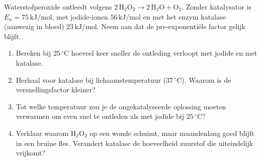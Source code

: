 \begin{oefening}
Waterstofperoxide ontleedt volgens \(\mathrm{2\,H_2O_2 \rightarrow 2\,H_2O + O_2}\). Zonder katalysator is \(E_a = 75\,\mathrm{kJ/mol}\), met jodide-ionen \(56\,\mathrm{kJ/mol}\) en met het enzym katalase (aanwezig in bloed) \(23\,\mathrm{kJ/mol}\). Neem aan dat de pre-exponentiële factor gelijk blijft.

\begin{enumerate}
\item[(a)]
  Bereken bij \(25\,^\circ\mathrm{C}\) hoeveel keer sneller de ontleding verloopt met jodide en met katalase.
\item[(b)]
  Herhaal voor katalase bij lichaamstemperatuur (\(37\,^\circ\mathrm{C}\)). Waarom is de versnellingsfactor kleiner?
\item[(c)]
  Tot welke temperatuur zou je de ongekatalyseerde oplossing moeten verwarmen om even snel te ontleden als met jodide bij \(25\,^\circ\mathrm{C}\)?
\item[(d)]
  Verklaar waarom \(\mathrm{H_2O_2}\) op een wonde schuimt, maar maandenlang goed blijft in een bruine fles. Verandert katalase de hoeveelheid zuurstof die uiteindelijk vrijkomt?
\end{enumerate}
\end{oefening}
